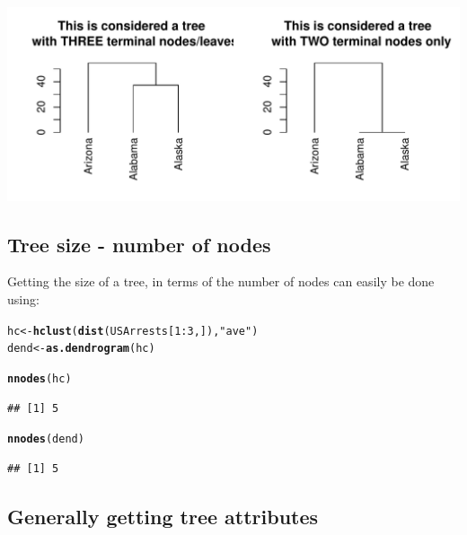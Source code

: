 \documentclass[shortnames,nojss,article]{jss}\usepackage[]{graphicx}\usepackage[]{color}
\makeatletter
\def\maxwidth{ %
  \ifdim\Gin@nat@width>\linewidth
    \linewidth
  \else
    \Gin@nat@width
  \fi
}
\newcommand{\hlnum}[1]{\textcolor[rgb]{0.686,0.059,0.569}{#1}}%
\newcommand{\hlstr}[1]{\textcolor[rgb]{0.192,0.494,0.8}{#1}}%
\newcommand{\hlopt}[1]{\textcolor[rgb]{0,0,0}{#1}}%
\newcommand{\hlstd}[1]{\textcolor[rgb]{0.345,0.345,0.345}{#1}}%
\newcommand{\hlkwb}[1]{\textcolor[rgb]{0.69,0.353,0.396}{#1}}%
\newcommand{\hlkwd}[1]{\textcolor[rgb]{0.737,0.353,0.396}{\textbf{#1}}}%
\newenvironment{kframe}{%
 \def\at@end@of@kframe{}%
 \ifinner\ifhmode%
  \def\at@end@of@kframe{\end{minipage}}%
  \begin{minipage}{\columnwidth}%
 \fi\fi%
 \def\FrameCommand##1{\hskip\@totalleftmargin \hskip-\fboxsep
 \colorbox{shadecolor}{##1}\hskip-\fboxsep
     \hskip-\linewidth \hskip-\@totalleftmargin \hskip\columnwidth}%
 \MakeFramed {\advance\hsize-\width
   \@totalleftmargin\z@ \linewidth\hsize
   \@setminipage}}%
 {\par\unskip\endMakeFramed%
 \at@end@of@kframe}
\newenvironment{knitrout}{}{} %
\makeatother
\begin{document}
\begin{knitrout}
{\centering \includegraphics[width=\maxwidth]{figure/unnamed-chunk-19} 

}



\end{knitrout}



\subsection{Tree size - number of nodes}

Getting the size of a tree, in terms of the number of nodes can easily be done using:

\begin{knitrout}
\color{fgcolor}\begin{kframe}
\begin{alltt}
\hlstd{hc} \hlkwb{<-} \hlkwd{hclust}\hlstd{(}\hlkwd{dist}\hlstd{(USArrests[}\hlnum{1}\hlopt{:}\hlnum{3}\hlstd{, ]),} \hlstr{"ave"}\hlstd{)}
\hlstd{dend} \hlkwb{<-} \hlkwd{as.dendrogram}\hlstd{(hc}\hlstd{)}

\hlkwd{nnodes}\hlstd{(hc)}
\end{alltt}
\begin{verbatim}
## [1] 5
\end{verbatim}
\begin{alltt}
\hlkwd{nnodes}\hlstd{(dend)}
\end{alltt}
\begin{verbatim}
## [1] 5
\end{verbatim}
\end{kframe}
\end{knitrout}




\subsection{Generally getting tree attributes}
\end{document}
